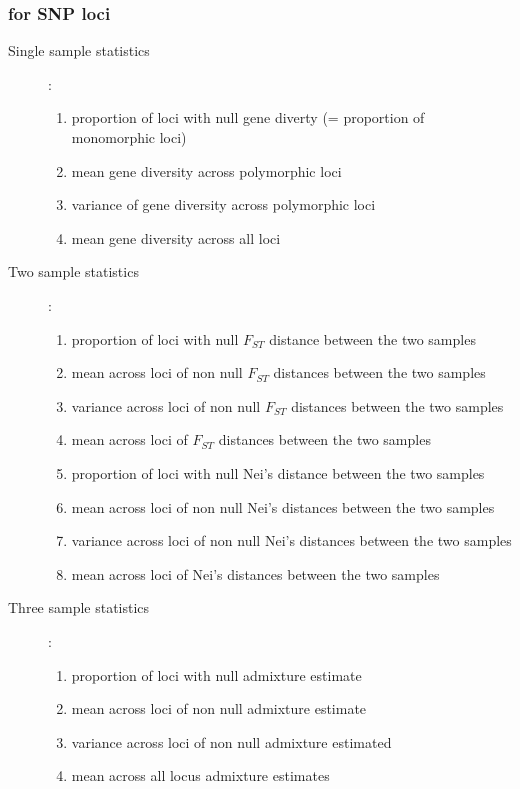 \subsubsection{for SNP loci}
\begin{description}
\item [{Single sample statistics}] :

\begin{enumerate}
\item proportion of loci with null gene diverty (= proportion of monomorphic
loci)
\item mean gene diversity across polymorphic loci \citep{N1987}
\item variance of gene diversity across polymorphic loci
\item mean gene diversity across all loci
\end{enumerate}
\item [{Two sample statistics}] :

\begin{enumerate}
\item proportion of loci with null $F_{ST}$ distance between the two samples
\citep{WC1984}
\item mean across loci of non null $F_{ST}$ distances between the two samples
\item variance across loci of non null $F_{ST}$ distances between the two
samples
\item mean across loci of $F_{ST}$ distances between the two samples
\item proportion of loci with null Nei's distance between the two samples
\citep{N1972}
\item mean across loci of non null Nei's distances between the two samples
\item variance across loci of non null Nei's distances between the two samples
\item mean across loci of Nei's distances between the two samples
\end{enumerate}
\item [{Three sample statistics}] :

\begin{enumerate}
\item proportion of loci with null admixture estimate
\item mean across loci of non null admixture estimate
\item variance across loci of non null admixture estimated
\item mean across all locus admixture estimates
\end{enumerate}
\end{description}

